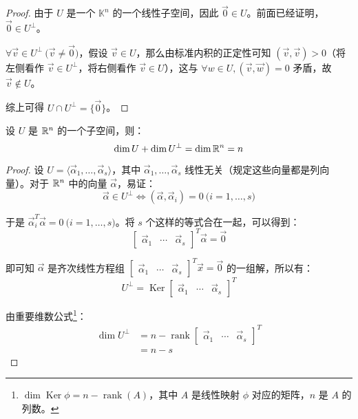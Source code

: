 \begin{proof}
	由于 $U$ 是一个 $\mathbb K^n$ 的一个线性子空间，因此 $\vec 0 \in U$。前面已经证明，$\vec 0 \in U^\perp$。

	$\forall \vec v \in U^\perp \pod{\vec v \ne \vec 0}$，假设 $\vec v \in U$，那么由标准内积的正定性可知 $(\vec v, \vec v) > 0$（将左侧看作 $\vec v \in U^\perp$，将右侧看作 $\vec v \in U$），这与 $\forall w \in U, (\vec v, \vec w) = 0$ 矛盾，故 $\vec v \not \in U$。

	综上可得 $U \cap U^\perp = \{\vec 0\}$。
\end{proof}

\begin{theorem}
	设 $U$ 是 $\mathbb R^n$ 的一个子空间，则：
	$$
	\dim U + \dim U^\perp = \dim \mathbb R^n = n
	$$
\end{theorem}

\begin{proof}
	设 $U = \langle \vec \alpha_1, \ldots, \vec \alpha_s \rangle$，其中 $\vec \alpha_1, \ldots, \vec \alpha_s$ 线性无关（规定这些向量都是列向量）。对于 $\mathbb R^n$ 中的向量 $\vec \alpha$，易证：
	$$
	\vec \alpha \in U^\perp \Longleftrightarrow (\vec \alpha, \vec \alpha_i) = 0 \pod{i = 1, \ldots, s}
	$$

	于是 $\vec \alpha_i^T \vec \alpha = 0 \pod{i = 1, \ldots, s}$。将 $s$ 个这样的等式合在一起，可以得到：
	$$
	\begin{bmatrix} \vec \alpha_1 & \cdots & \vec \alpha_s \end{bmatrix}^T \vec \alpha = \vec 0
	$$

	即可知 $\vec \alpha$ 是齐次线性方程组 $\begin{bmatrix} \vec \alpha_1 & \cdots & \vec \alpha_s \end{bmatrix}^T \vec x = \vec 0$ 的一组解，所以有：
	$$
	U^\perp = \operatorname{Ker} \begin{bmatrix} \vec \alpha_1 & \cdots & \vec \alpha_s \end{bmatrix}^T
	$$

	由重要维数公式\footnote{$\dim \operatorname{Ker} \phi = n - \operatorname{rank}(A)$，其中 $A$ 是线性映射 $\phi$ 对应的矩阵，$n$ 是 $A$ 的列数。}：
	$$
	\begin{aligned}
		\dim U^\perp &= n - \operatorname{rank} \begin{bmatrix} \vec \alpha_1 & \cdots & \vec \alpha_s \end{bmatrix}^T
		\\&=
		n - s
	\end{aligned}
	$$
\end{proof}

